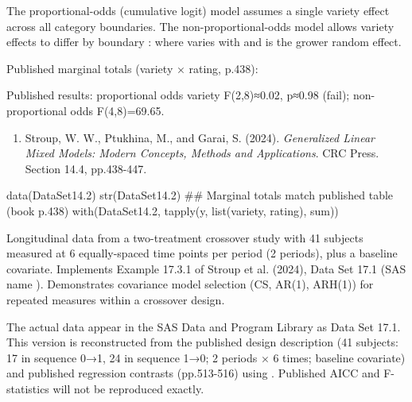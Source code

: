 \documentclass[a4paper]{book}
\begin{document}
%
\begin{Details}
The proportional-odds (cumulative logit) model assumes a single variety
effect across all category boundaries.  The non-proportional-odds model
allows variety effects to differ by boundary :
where  varies with  and
 is the grower random effect.

Published marginal totals (variety × rating, p.438):

Published results: proportional odds variety F(2,8)≈0.02, p≈0.98 (fail);
non-proportional odds F(4,8)=69.65.
\end{Details}
%
\begin{References}
\begin{enumerate}

\item{} Stroup, W. W., Ptukhina, M., and Garai, S. (2024).
\emph{Generalized Linear Mixed Models: Modern Concepts,
Methods and Applications}. CRC Press. Section 14.4, pp.438-447.

\end{enumerate}

\end{References}
%
\begin{SeeAlso}
\end{SeeAlso}
%
\begin{Examples}
\begin{ExampleCode}
data(DataSet14.2)
str(DataSet14.2)
## Marginal totals match published table (book p.438)
with(DataSet14.2, tapply(y, list(variety, rating), sum))
\end{ExampleCode}
\end{Examples}
%
\begin{Description}
Longitudinal data from a two-treatment crossover study with 41 subjects
measured at 6 equally-spaced time points per period (2 periods), plus a
baseline covariate.  Implements Example 17.3.1 of Stroup et al. (2024),
Data Set 17.1 (SAS name ).  Demonstrates covariance
model selection (CS, AR(1), ARH(1)) for repeated measures within a
crossover design.

 The actual data appear in the SAS Data and
Program Library as Data Set 17.1.  This version is reconstructed from the
published design description (41 subjects: 17 in sequence 0→1, 24 in
sequence 1→0; 2 periods × 6 times; baseline covariate) and published
regression contrasts (pp.513-516) using .
Published AICC and F-statistics will not be reproduced exactly.
\end{Description}
\end{document}
